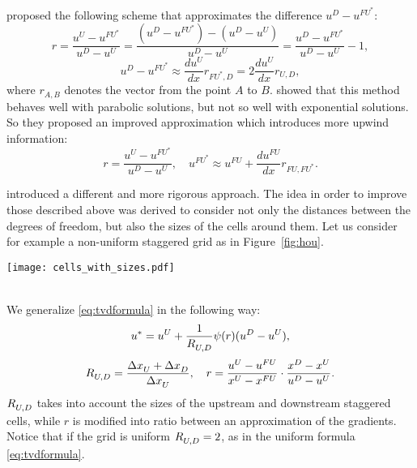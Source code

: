 \textcite{nonunif:darmou} proposed the following scheme that 
approximates the difference $u^D - u^{FU^*}$:
\begin{equation}
r = \frac{u^U - u^{FU^*}}{u^D - u^U} = \frac{(u^D - u^{FU^*})-(u^D - u^U)}{u^D 
- u^U} = \frac{u^D - u^{FU^*}}{u^D - u^U} - 1,
\end{equation}
\begin{equation}
u^D - u^{FU^*} \approx \frac{du^U}{dx} r_{ \scriptscriptstyle FU^*, D} = 2 
\frac{du^U}{dx} r_{\scriptscriptstyle U, D},
\end{equation}
where $r_{ \scriptscriptstyle A, B} $ denotes the vector from the point $A$ to 
$B$. \textcite{nonunif:li} showed that this method behaves well with parabolic 
solutions, but not so well with exponential solutions. So they proposed an 
improved approximation which introduces more upwind information:
\begin{equation}
r = \frac{u^U - u^{FU^*}}{u^D - u^U}, \quad u^{FU^*} \approx u^{FU} + 
\frac{d u^{FU}}{dx} r_{\scriptscriptstyle FU, FU^*}.
\end{equation}

\textcite{nonunif:hou} introduced a different and more rigorous approach. The 
idea in order to improve those described above was derived to consider not only 
the distances between the degrees of freedom, but also the sizes of the cells 
around them. Let us consider for example a non-uniform staggered grid as in 
Figure~\ref{fig:hou}.
\begin{figure*}[h]
	\centering
	\texttt{[image: cells\_with\_sizes.pdf]}
	\caption[Non-uniform staggered grid with cell sizes]{Non-uniform staggered 
	grid with cell sizes.}
	\label{fig:hou}
\end{figure*}
\\We generalize \eqref{eq:tvdformula} in the following way:
\begin{equation}
u^* = u^U + \frac{1}{\RUD} \psi(r) (u^D - u^U),
\end{equation}
\begin{equation}
\RUD = \frac{\Delta \xU + \Delta \xD}{\Delta \xU}, \quad r = \frac{u^U - 
u^{FU}}{x^U - x^{FU}} \cdot \frac{x^D - x^U}{u^D - u^U}.
\end{equation}
$\RUD$ takes into account the sizes of the upstream and downstream 
staggered cells, while $r$ is modified into ratio between an approximation of 
the gradients. Notice that if the grid is uniform $\RUD = 2$, as in the uniform 
formula \eqref{eq:tvdformula}.

